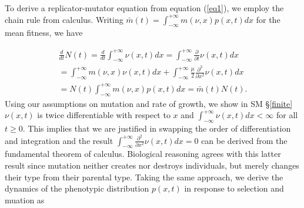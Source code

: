 \documentclass[]{article}
\begin{document}
To derive a replicator-mutator equation from equation (\ref{eq1}), we
employ the chain rule from calculus. Writing
\(\bar m(t)=\int_{-\infty}^{+\infty}m(\nu,x)p(x,t)dx\) for the mean
fitness, we have

\begin{multline}\label{N_det}
\frac{d}{dt}N(t)=\frac{d}{dt}\int_{-\infty}^{+\infty}\nu(x,t)dx=\int_{-\infty}^{+\infty}\frac{\partial}{\partial t}\nu(x,t)dx \\
=\int_{-\infty}^{+\infty} m(\nu,x)\nu(x,t)dx+\int_{-\infty}^{+\infty}\frac{\mu}{2}\frac{\partial^2}{\partial x^2}\nu(x,t)dx \\
=N(t)\int_{-\infty}^{+\infty} m(\nu,x)p(x,t)dx=\bar m(t) N(t).
\end{multline} Using our assumptions on mutation and rate of growth, we
show in SM \S\ref{finite} \(\nu(x,t)\) is twice differentiable with
respect to \(x\) and \(\int_{-\infty}^{+\infty}\nu(x,t)dx<\infty\) for
all \(t\geq0\). This implies that we are justified in swapping the order
of differentiation and integration and the result
\(\int_{-\infty}^{+\infty}\frac{\partial^2}{\partial x^2}\nu(x,t)dx=0\)
can be derived from the fundamental theorem of calculus. Biological
reasoning agrees with this latter result since mutation neither creates
nor destroys individuals, but merely changes their type from their
parental type. Taking the same approach, we derive the dynamics of the
phenotypic distribution \(p(x,t)\) in response to selection and muation
as
\end{document}
